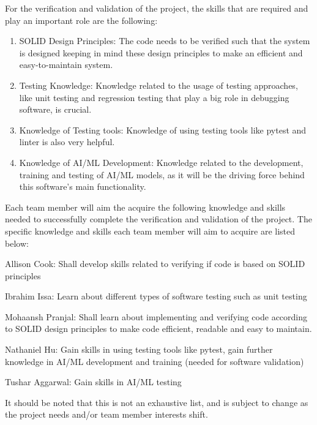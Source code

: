 \documentclass[12pt, titlepage]{article}
\begin{document}
For the verification and validation of the project, the skills that are required and play an important role are the following:
\begin{enumerate}
  \item SOLID Design Principles: The code needs to be verified such that the system is designed keeping in mind these design principles to make an efficient and easy-to-maintain system.
  \item Testing Knowledge: Knowledge related to the usage of testing approaches, like unit testing and regression testing that play a big role in debugging software, is crucial.
  \item Knowledge of Testing tools: Knowledge of using testing tools like pytest and linter is also very helpful.
  \item Knowledge of AI/ML Development: Knowledge related to the development, training and testing of AI/ML models, as it will be the driving force behind this software's main functionality.
\end{enumerate}
Each team member will aim the acquire the following knowledge and skills needed to successfully complete the verification and validation of the project. The specific knowledge and skills each team member will aim to acquire are listed below: \\
\begin{enumerate}
    \begin{item}
        Allison Cook: Shall develop skills related to verifying if code is based on SOLID principles
    \end{item}
    \begin{item}
        Ibrahim Issa: Learn about different types of software testing such as unit testing
    \end{item}
    \begin{item}
        Mohaansh Pranjal: Shall learn about implementing and verifying code according to SOLID design principles to make code efficient, readable and easy to maintain.
    \end{item}
    \begin{item}
        Nathaniel Hu: Gain skills in using testing tools like pytest, gain further knowledge in AI/ML development and training (needed for software validation)
    \end{item}
    \begin{item}
        Tushar Aggarwal: Gain skills in AI/ML testing
    \end{item}
\end{enumerate}
It should be noted that this is not an exhaustive list, and is subject to change as the project needs and/or team member interests shift. \\
\end{document}
